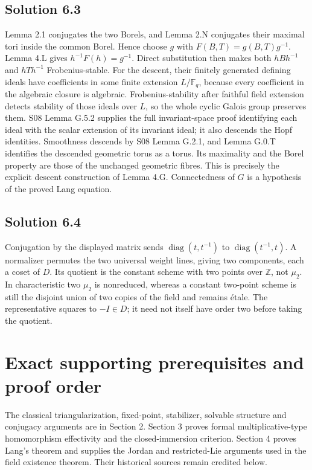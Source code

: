 \documentclass[11pt,a4paper,openany]{report}
\begin{document}
\subsection{Solution 6.3}\label{AG-RG-01-solution-6.3}

Lemma 2.1 conjugates the two Borels, and Lemma 2.N conjugates their maximal tori inside the common Borel. Hence choose \(g\) with \(F(B,T)=g(B,T)g^{-1}\). Lemma 4.L gives \(h^{-1}F(h)=g^{-1}\). Direct substitution then makes both \(hBh^{-1}\) and \(hTh^{-1}\) Frobenius-stable. For the descent, their finitely generated defining ideals have coefficients in some finite extension \(L/\mathbb F_q\), because every coefficient in the algebraic closure is algebraic. Frobenius-stability after faithful field extension detects stability of those ideals over \(L\), so the whole cyclic Galois group preserves them. S08 Lemma G.5.2 supplies the full invariant-space proof identifying each ideal with the scalar extension of its invariant ideal; it also descends the Hopf identities. Smoothness descends by S08 Lemma G.2.1, and Lemma G.0.T identifies the descended geometric torus as a torus. Its maximality and the Borel property are those of the unchanged geometric fibres. This is precisely the explicit descent construction of Lemma 4.G. Connectedness of \(G\) is a hypothesis of the proved Lang equation.

\subsection{Solution 6.4}\label{AG-RG-01-solution-6.4}

Conjugation by the displayed matrix sends \(\operatorname{diag}(t,t^{-1})\) to \(\operatorname{diag}(t^{-1},t)\). A normalizer permutes the two universal weight lines, giving two components, each a coset of \(D\). Its quotient is the constant scheme with two points over \(\mathbb Z\), not \(\mu_2\). In characteristic two \(\mu_2\) is nonreduced, whereas a constant two-point scheme is still the disjoint union of two copies of the field and remains étale. The representative squares to \(-I\in D\); it need not itself have order two before taking the quotient.

\section{Exact supporting prerequisites and proof order}\label{AG-RG-01-exact-supporting-prerequisites-and-proof-order}

The classical triangularization, fixed-point, stabilizer, solvable structure and conjugacy arguments are in Section 2. Section 3 proves formal multiplicative-type homomorphism effectivity and the closed-immersion criterion. Section 4 proves Lang's theorem and supplies the Jordan and restricted-Lie arguments used in the field existence theorem. Their historical sources remain credited below.
\end{document}
